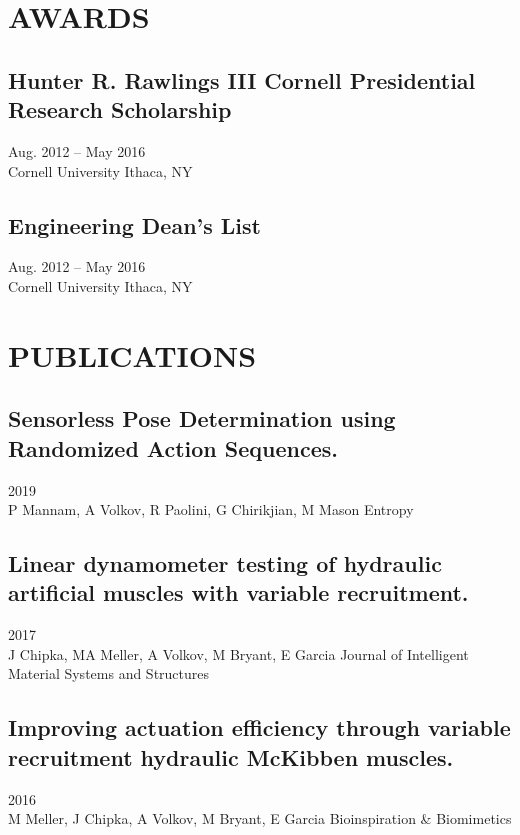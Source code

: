\documentclass[]{article}
\begin{document}
\section*{AWARDS}

\subsection*{Hunter R. Rawlings III Cornell Presidential Research Scholarship} \hfill Aug. 2012 -- May 2016 \\
Cornell University \hfill Ithaca, NY

\subsection*{Engineering Dean's List} \hfill Aug. 2012 -- May 2016 \\
Cornell University \hfill Ithaca,  NY

\section*{PUBLICATIONS\endnotemark}

\subsection*{Sensorless Pose Determination using Randomized Action Sequences.} \hfill 2019 \\
P Mannam, A Volkov, R Paolini, G Chirikjian, M Mason \hfill Entropy

\subsection*{Linear dynamometer testing of hydraulic artificial muscles with variable recruitment.} \hfill 2017 \\
J Chipka, MA Meller, A Volkov, M Bryant, E Garcia \hfill Journal of Intelligent Material Systems and Structures

\subsection*{Improving actuation efficiency through variable recruitment hydraulic McKibben muscles.} \hfill 2016 \\
M Meller, J Chipka, A Volkov, M Bryant, E Garcia \hfill Bioinspiration \& Biomimetics

\end{document}
